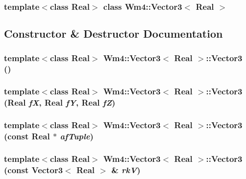 \subsubsection*{template$<$class Real$>$ class Wm4::Vector3$<$ Real $>$}



\subsection{Constructor \& Destructor Documentation}
\subsubsection{\setlength{\rightskip}{0pt plus 5cm}template$<$class Real$>$ {\bf Wm4::Vector3}$<$ Real $>$::{\bf Vector3} ()}\label{classWm4_1_1Vector3_0be5457c1a2ed752bd762a343fff6966}


\subsubsection{\setlength{\rightskip}{0pt plus 5cm}template$<$class Real$>$ {\bf Wm4::Vector3}$<$ Real $>$::{\bf Vector3} (Real {\em f\-X}, Real {\em f\-Y}, Real {\em f\-Z})}\label{classWm4_1_1Vector3_c447f97781c24e59be04539611a59e56}


\subsubsection{\setlength{\rightskip}{0pt plus 5cm}template$<$class Real$>$ {\bf Wm4::Vector3}$<$ Real $>$::{\bf Vector3} (const Real $\ast$ {\em af\-Tuple})}\label{classWm4_1_1Vector3_1c8c298fef9dacf92a789178878d4803}


\subsubsection{\setlength{\rightskip}{0pt plus 5cm}template$<$class Real$>$ {\bf Wm4::Vector3}$<$ Real $>$::{\bf Vector3} (const {\bf Vector3}$<$ Real $>$ \& {\em rk\-V})}\label{classWm4_1_1Vector3_e231716c3dd5d198ad17ef0c55cdd90b}




